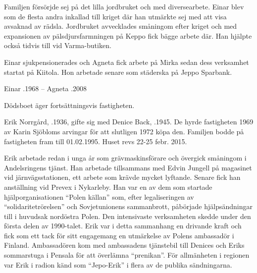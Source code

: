 
Familjen försörjde sej på det lilla jordbruket och med diversearbete. Einar blev som de flesta andra inkallad till kriget där han utmärkte sej med att visa avsaknad av rädsla. Jordbruket avvecklades småningom efter kriget och med expansionen av pälsdjursfarmningen på Keppo fick bägge arbete där. Han hjälpte också tidvis till vid Varma-butiken.

Einar sjukpensionerades och Agneta fick arbete på Mirka sedan dess verksamhet startat på Kiitola. Hon arbetade senare som städerska på Jeppo Sparbank.
\begin{jhchildren}
  \item {}
  \item {}
  \item {}
  \item {}
\end{jhchildren}

Einar .1968  --  Agneta .2008

Dödsboet äger fortsättningsvis fastigheten.




Erik Norrgård, .1936, gifte sig med Denice Back, .1945. De hyrde fastigheten 1969 av Karin Sjöbloms arvingar för att slutligen 1972 köpa den. Familjen bodde på fastigheten fram till 01.02.1995. Huset revs 22-25 febr. 2015.

Erik arbetade redan i unga år som grävmaskinsförare och övergick småningom i Andelsringens tjänst. Han arbetade tillsammans med Edvin Jungell på magasinet vid järnvägsstationen, ett arbete som krävde mycket lyftande.  Senare fick han anställning vid Prevex i Nykarleby. Han var en av dem som startade hjälporganisationen ``Polen källan'' som, efter legaliseringen av ``solidaritetrörelsen'' och Sovjetunionens sammanbrott, påbörjade hjälpsändningar till i huvudsak nordöstra Polen. Den intensivaste verksamheten skedde under den första delen av 1990-talet. Erik var i detta sammanhang en drivande kraft och fick som ett tack för sitt engagemang en utmärkelse av Polens ambassadör i Finland. Ambassadören kom med ambassadens tjänstebil till Denices och Eriks sommarstuga i Pensala för att överlämna ``prenikan''. För allmänheten i regionen var Erik i radion känd som ``Jepo-Erik'' i flera av de publika sändningarna.

